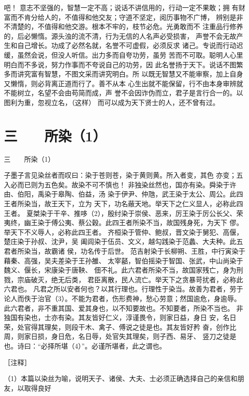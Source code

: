 \documentclass[12pt,UTF8]{ctexbook}
\begin{document}
吧！ 
意志不坚强的，智慧一定不高；说话不讲信用的，行动一定不果敢；拥 
有财富而不肯分给人的，不值得和他交友；守道不坚定，阅历事物不广博， 
辨别是非不清楚的，不值得和他交游。根本不牢的，枝节必危。光勇敢而不 
注重品行修养的，后必懒惰。源头浊的流不清，行为无信的人名声必受损害， 
声誉不会无故产生和自己增长。功成了必然名就，名誉不可虚假，必须反求 
诸己。专说而行动迟缓，虽然会说，但没人听信。出力多而自夸功劳，虽劳 
苦而不可取。聪明人心里明白而不多说，努力作事而不夸说自己的功劳，因 
此名誉扬于天下。说话不图繁多而讲究富有智慧，不图文采而讲究明白。所 
以既无智慧又不能审察，加上自身又懒惰，则必背离正道而行了。善不从本 
心生出就不能保留，行不由本身审辨就不能树立，名望不会由苟简而成，声 
誉不会因诈伪而立，君子是言行合一的。以图利为重，忽视立名，（这样） 
而可以成为天下贤士的人，还不曾有过。 


\chapter{三　　所染（1）}

三　　所染（1）

子墨子言见染丝者而叹曰：染于苍则苍，染于黄则黄。所入者变，其色 
亦变；五入必而已则为五色矣。故染不可不慎也！ 
非独染丝然也，国亦有染。舜染于许由、伯阳，禹染于皋陶、伯益，汤 
染于伊尹、仲虺，武王染于太公、周公。此四王者所染当，故王天下，立为 
天下，功名蔽天地。举天下之仁义显人，必称此四王者。 
夏桀染于干辛、推哆（2），殷纣染于崇侯、恶来，厉王染于厉公长父、荣 
夷终，幽王染于傅公夷、蔡公穀。此四王者所染不当，故国残身死，为天下 
僇。举天下不义辱人，必称此四王者。 
齐桓染于管仲、鲍叔，晋文染于舅犯、高偃，楚庄染于孙叔、沈尹，吴 
阖闾染于伍员、文义，越勾践染于范蠡、大夫种。此五君者所染当，故霸诸 
侯，功名传于后世。 
范吉射染于长柳朔、王胜，中行寅染于藉秦、高强，吴夫差染于王孙雒、 
太宰嚭，智伯摇染于智国、张武，中山尚染于魏义、偃长，宋康染于唐鞅、 
佃不礼。此六君者所染不当，故国家残亡，身为刑戮，宗庙破灭，绝无后类， 
君臣离散，民人流亡。举天下之贪暴苛扰者，必称此六君也。 
凡君之所以安者何也？以其行理也。行理性于染当。故善为君者，劳于 
论人而佚于治官（3）。不能为君者，伤形费神，愁心劳意；然国逾危，身逾辱。 
此六君者，非不重其国、爱其身也，以不知要故也。不知要者，所染不当也。 
非独国有染也，士亦有染。其友皆好仁义，淳谨畏令，则家日益，身日 
安，名日荣，处官得其理矣，则段干木、禽子、傅说之徒是也。其友皆好矜 
奋，创作比周，则家日损，身日危，名日辱，处官失其理矣，则子西、易牙、 
竖刀之徒是也。诗曰：“必择所堪（4）”。必谨所堪者，此之谓也。 


［注释］ 

（1）本篇以染丝为喻，说明天子、诸侯、大夫、士必须正确选择自己的亲信和朋友，以取得良好 
\end{document}

